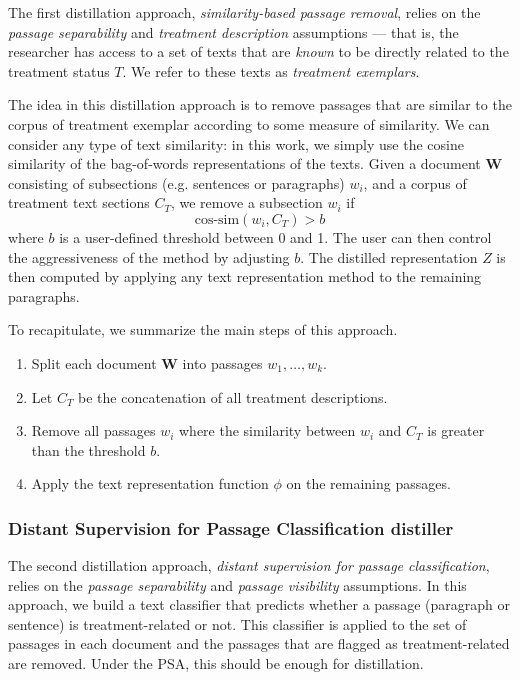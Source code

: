 \documentclass[11pt]{article}
\newcommand{\bW}{\bm{W}}  %
\begin{document}
The first distillation approach, \emph{similarity-based passage removal}, relies on the \emph{passage separability} and \emph{treatment description} assumptions --- that is, the researcher has access to a set of texts that are \emph{known} to be directly related to the treatment status $T$. We refer to these texts as \emph{treatment exemplars}.

The idea in this distillation approach is to remove passages that are similar to the corpus of treatment exemplar according to some measure of similarity.
We can consider any type of text similarity: in this work, we simply use the cosine similarity of the bag-of-words representations of the texts.
Given a document $\bW$ consisting of subsections (e.g. sentences or paragraphs) $w_i$, and a corpus of treatment text sections $C_T$, we remove a subsection $w_i$ if
\[
\text{cos-sim}(w_i, C_T) > b
\]
where $b$ is a user-defined threshold between 0 and 1.
The user can then control the aggressiveness of the method by adjusting $b$.
The distilled representation $Z$ is then computed by applying any text representation method to the remaining paragraphs.

To recapitulate, we summarize the main steps of this approach.
\begin{enumerate}%
    \item Split each document $\bW$ into passages $w_1, \ldots, w_k$.

    \item Let $C_T$ be the concatenation of all treatment descriptions.

    \item Remove all passages $w_i$ where the similarity between $w_i$ and $C_T$ is greater than the threshold $b$.

    \item Apply the text representation function $\phi$ on the remaining passages.
\end{enumerate}

\subsubsection{Distant Supervision for Passage Classification distiller}

The second distillation approach, \emph{distant supervision for passage classification}, relies on the \emph{passage separability} and \emph{passage visibility} assumptions.
In this approach, we build a text classifier that predicts whether a passage (paragraph or sentence) is treatment-related or not. This classifier is applied to the set of passages in each document and the passages that are flagged as treatment-related are removed. Under the PSA, this should be enough for distillation.
\end{document}
